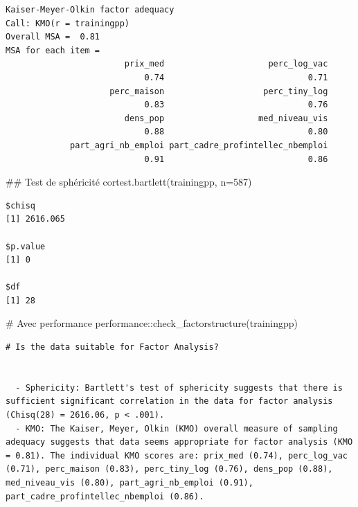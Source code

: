 \documentclass[
  french,
  11pt,
  a4paper,
]{article}
\newenvironment{Shaded}{}{}
\newcommand{\AttributeTok}[1]{\textcolor[rgb]{0.84,0.23,0.29}{#1}}
\newcommand{\CommentTok}[1]{\textcolor[rgb]{0.42,0.45,0.49}{#1}}
\newcommand{\DecValTok}[1]{\textcolor[rgb]{0.00,0.36,0.77}{#1}}
\newcommand{\DocumentationTok}[1]{\textcolor[rgb]{0.42,0.45,0.49}{#1}}
\newcommand{\FunctionTok}[1]{\textcolor[rgb]{0.44,0.26,0.76}{#1}}
\newcommand{\NormalTok}[1]{\textcolor[rgb]{0.14,0.16,0.18}{#1}}
\newcommand{\SpecialCharTok}[1]{\textcolor[rgb]{0.00,0.36,0.77}{#1}}
\begin{document}
\begin{verbatim}
Kaiser-Meyer-Olkin factor adequacy
Call: KMO(r = trainingpp)
Overall MSA =  0.81
MSA for each item = 
                        prix_med                     perc_log_vac 
                            0.74                             0.71 
                     perc_maison                    perc_tiny_log 
                            0.83                             0.76 
                        dens_pop                   med_niveau_vis 
                            0.88                             0.80 
             part_agri_nb_emploi part_cadre_profintellec_nbemploi 
                            0.91                             0.86 
\end{verbatim}

\begin{Shaded}
\begin{Highlighting}[]
\DocumentationTok{\#\# Test de sphéricité}
\FunctionTok{cortest.bartlett}\NormalTok{(trainingpp, }\AttributeTok{n=}\DecValTok{587}\NormalTok{)}
\end{Highlighting}
\end{Shaded}

\begin{verbatim}
$chisq
[1] 2616.065

$p.value
[1] 0

$df
[1] 28
\end{verbatim}

\begin{Shaded}
\begin{Highlighting}[]
\CommentTok{\# Avec performance}
\NormalTok{performance}\SpecialCharTok{::}\FunctionTok{check\_factorstructure}\NormalTok{(trainingpp)}
\end{Highlighting}
\end{Shaded}

\begin{verbatim}
# Is the data suitable for Factor Analysis?


  - Sphericity: Bartlett's test of sphericity suggests that there is sufficient significant correlation in the data for factor analysis (Chisq(28) = 2616.06, p < .001).
  - KMO: The Kaiser, Meyer, Olkin (KMO) overall measure of sampling adequacy suggests that data seems appropriate for factor analysis (KMO = 0.81). The individual KMO scores are: prix_med (0.74), perc_log_vac (0.71), perc_maison (0.83), perc_tiny_log (0.76), dens_pop (0.88), med_niveau_vis (0.80), part_agri_nb_emploi (0.91), part_cadre_profintellec_nbemploi (0.86).
\end{verbatim}
\end{document}
